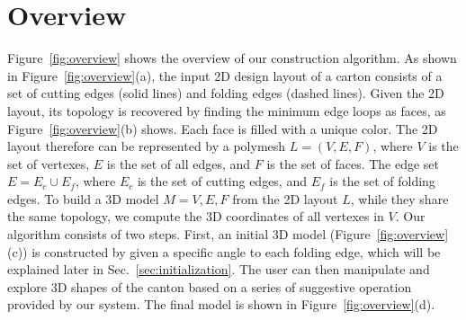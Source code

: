 \section{Overview}\label{sec:overview}




 
Figure~\ref{fig:overview} shows the overview of our construction algorithm. 
As shown in Figure~\ref{fig:overview}(a), the input 2D design layout of a carton consists of a set of cutting edges (solid lines) and folding edges (dashed lines).
%
Given the 2D layout, its topology is recovered by finding the minimum edge loops as faces, as Figure~\ref{fig:overview}(b) shows. Each face is filled with a unique color. %
The 2D layout therefore can be represented by a polymesh $L=(V,E,F)$, where $V$ is the set of vertexes, $E$ is the set of all edges, and $F$ is the set of faces. 
The edge set $E=E_c\cup E_f$, where $E_c$ is the set of cutting edges, and $E_f$ is the set of folding edges.
%
To build a 3D model $M={V, E, F}$ from the 2D layout $L$, while they share the same topology, we compute the 3D coordinates of all vertexes in $V$. 
%
Our algorithm consists of two steps. 
First, an initial 3D model (Figure~\ref{fig:overview}(c)) is constructed by given a specific angle to each folding edge, which will be explained later in Sec.~\ref{sec:initialization}.
The user can then manipulate and explore 3D shapes of the canton based on a series of suggestive operation provided by our system. 
%
The final model is shown in Figure~\ref{fig:overview}(d).



